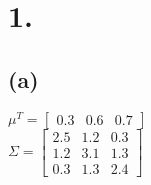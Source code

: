 \documentclass{article}
\begin{document}
\thispagestyle{firstpageheader}

\section*{1.}

{\Large 


\subsection*{(a)}

$\mu^T = 
\begin{bmatrix}
  0.3 & 0.6 & 0.7
\end{bmatrix}$ \\
$ \Sigma = 
\begin{bmatrix}
2.5 & 1.2 & 0.3 \\
1.2 & 3.1 & 1.3 \\
0.3 & 1.3 & 2.4
\end{bmatrix}$ \\ 

}
\end{document}
